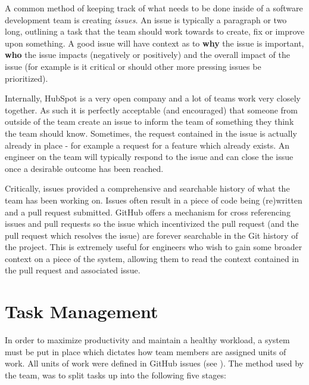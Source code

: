 A common method of keeping track of what needs to be done inside of a software development team is creating \textit{issues}. An issue is typically a paragraph or two long, outlining a task that the team should work towards to create, fix or improve upon something. A good issue will have context as to \textbf{why} the issue is important, \textbf{who} the issue impacts (negatively or positively) and the overall impact of the issue (for example is it critical or should other more pressing issues be prioritized). 

Internally, HubSpot is a very open company and a lot of teams work very closely together. As such it is perfectly acceptable (and encouraged) that someone from outside of the team create an issue to inform the team of something they think the team should know. Sometimes, the request contained in the issue is actually already in place - for example a request for a feature which already exists. An engineer on the team will typically respond to the issue and can close the issue once a desirable outcome has been reached. 

Critically, issues provided a comprehensive and searchable history of what the team has been working on. Issues often result in a piece of code being (re)written and a pull request submitted. GitHub offers a mechanism for cross referencing issues and pull requests so the issue which incentivized the pull request (and the pull request which resolves the issue) are forever searchable in the Git history of the project. This is extremely useful for engineers who wish to gain some broader context on a piece of the system, allowing them to read the context contained in the pull request and associated issue. 

\section{Task Management}
In order to maximize productivity and maintain a healthy workload, a system must be put in place which dictates how team members are assigned units of work. All units of work were defined in GitHub issues (see ). The method used by the \team{} team, was to split tasks up into the following five stages:


